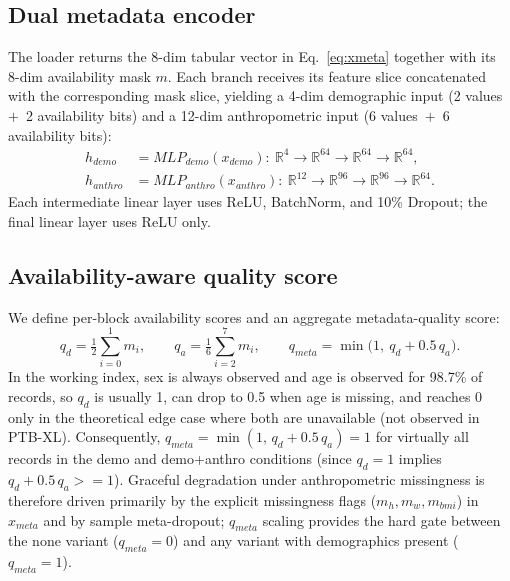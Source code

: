 \documentclass[mathematics,article,pdftex]{Definitions/mdpi}
\def\texttt#1{#1}%
\def\mathrm#1{#1}%
\def\mathbf#1{#1}%
\def\geq{>=}%
\begin{document}
\subsection{Dual metadata encoder}
The loader returns the 8-dim tabular vector in Eq.~\eqref{eq:xmeta} together with its 8-dim availability mask $\mathbf{m}$. Each branch receives its feature slice concatenated with the corresponding mask slice, yielding a 4-dim demographic input (2 values~$+$~2 availability bits) and a 12-dim anthropometric input (6 values~$+$~6 availability bits):
\begin{align}
\mathbf{h}_{\mathrm{demo}}   &= \mathrm{MLP}_{\mathrm{demo}}(\mathbf{x}_{\mathrm{demo}}):\ \mathbb{R}^{4}\to\mathbb{R}^{64}\to\mathbb{R}^{64}\to\mathbb{R}^{64}, \\
\mathbf{h}_{\mathrm{anthro}} &= \mathrm{MLP}_{\mathrm{anthro}}(\mathbf{x}_{\mathrm{anthro}}):\ \mathbb{R}^{12}\to\mathbb{R}^{96}\to\mathbb{R}^{96}\to\mathbb{R}^{64}.
\end{align}
Each intermediate linear layer uses ReLU, BatchNorm, and 10\% Dropout; the final linear layer uses ReLU only.

\subsection{Availability-aware quality score}
We define per-block availability scores and an aggregate metadata-quality score:
\begin{equation}\label{eq:qmeta}
q_{d} = \tfrac{1}{2}\sum_{i=0}^{1} m_i, \qquad
q_{a} = \tfrac{1}{6}\sum_{i=2}^{7} m_i, \qquad
q_{\mathrm{meta}} = \min\!\bigl(1,\ q_{d} + 0.5\,q_{a}\bigr).
\end{equation}
In the working index, sex is always observed and age is observed for 98.7\% of records, so $q_d$ is usually 1, can drop to 0.5 when age is missing, and reaches 0 only in the theoretical edge case where both are unavailable (not observed in PTB-XL). Consequently, $q_{\mathrm{meta}} = \min(1,\,q_d + 0.5\,q_a) = 1$ for virtually all records in the \texttt{demo} and \texttt{demo+anthro} conditions (since $q_d{=}1$ implies $q_d + 0.5\,q_a \geq 1$). Graceful degradation under anthropometric missingness is therefore driven primarily by the explicit missingness flags ($m_h, m_w, m_{\mathrm{bmi}}$) in $\mathbf{x}_{\mathrm{meta}}$ and by sample meta-dropout; $q_{\mathrm{meta}}$ scaling provides the hard gate between the \texttt{none} variant ($q_{\mathrm{meta}}{=}0$) and any variant with demographics present ($q_{\mathrm{meta}}{=}1$).
\end{document}
